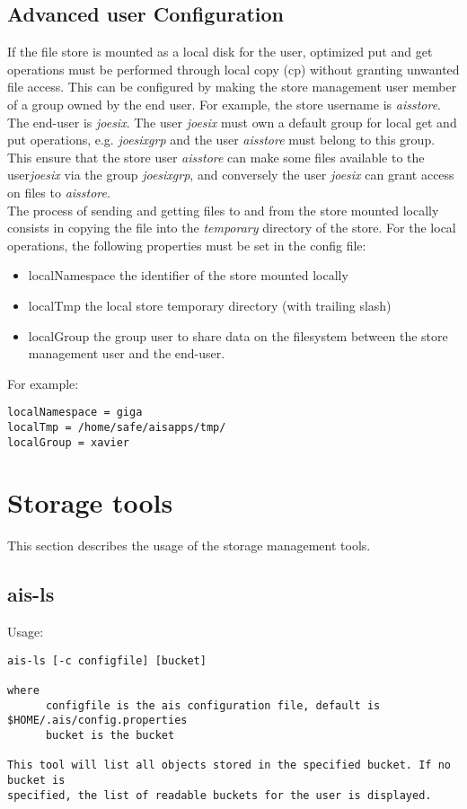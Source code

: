 \documentclass[11pt]{article}
\begin{document}
\subsection{Advanced user Configuration}
If the file store is mounted as a local disk for the user, optimized put and get operations must be performed through local copy (cp) without granting unwanted file access. This can be configured by making the store management user member of a group owned by the end user. For example, the store username is \emph{aisstore}. The end-user is \emph{joesix}. The user \emph{joesix} must own a default group for local get and put operations, e.g. \emph{joesixgrp} and the user \emph{aisstore} must belong to this group. This ensure that the store user \emph{aisstore} can make some files available to the user\emph{joesix} via the group \emph{joesixgrp}, and conversely the user \emph{joesix} can grant access on files to \emph{aisstore}.\\
The process of sending and getting files to and from the store mounted locally consists in copying the file into the \emph{temporary} directory of the store. For the local operations, the following properties must be set in the config file:
\begin{itemize}
\item localNamespace the identifier of the store mounted locally
\item localTmp the local store temporary directory (with trailing slash)
\item localGroup the group user to share data on the filesystem between the store management user and the end-user.
\end{itemize}
For example:
\begin{verbatim}
localNamespace = giga
localTmp = /home/safe/aisapps/tmp/
localGroup = xavier
\end{verbatim}

\section{Storage tools}
This section describes the usage of the storage management tools.
\subsection{ais-ls}
Usage:\\
\begin{verbatim}
ais-ls [-c configfile] [bucket]

where 
      configfile is the ais configuration file, default is $HOME/.ais/config.properties
      bucket is the bucket
      
This tool will list all objects stored in the specified bucket. If no bucket is 
specified, the list of readable buckets for the user is displayed.
\end{verbatim}
\end{document}
